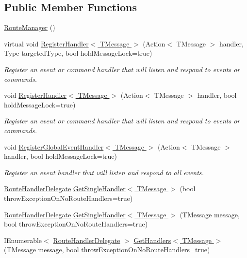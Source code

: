 \subsection*{Public Member Functions}
\begin{DoxyCompactItemize}
\item 
\hyperlink{classCqrs_1_1Bus_1_1RouteManager_abcc8a62319ac7a6edd38ed2d26ef5234_abcc8a62319ac7a6edd38ed2d26ef5234}{Route\+Manager} ()
\item 
virtual void \hyperlink{classCqrs_1_1Bus_1_1RouteManager_a5a01e8a6c9ae6311bca2d9e5cb75a7b9_a5a01e8a6c9ae6311bca2d9e5cb75a7b9}{Register\+Handler$<$ T\+Message $>$} (Action$<$ T\+Message $>$ handler, Type targeted\+Type, bool hold\+Message\+Lock=true)
\begin{DoxyCompactList}\small\item\em Register an event or command handler that will listen and respond to events or commands. \end{DoxyCompactList}\item 
void \hyperlink{classCqrs_1_1Bus_1_1RouteManager_aeb620222dd0351a6d3848caf93e29954_aeb620222dd0351a6d3848caf93e29954}{Register\+Handler$<$ T\+Message $>$} (Action$<$ T\+Message $>$ handler, bool hold\+Message\+Lock=true)
\begin{DoxyCompactList}\small\item\em Register an event or command handler that will listen and respond to events or commands. \end{DoxyCompactList}\item 
void \hyperlink{classCqrs_1_1Bus_1_1RouteManager_a1f8fb95b11955aa0762a76f9b39233ec_a1f8fb95b11955aa0762a76f9b39233ec}{Register\+Global\+Event\+Handler$<$ T\+Message $>$} (Action$<$ T\+Message $>$ handler, bool hold\+Message\+Lock=true)
\begin{DoxyCompactList}\small\item\em Register an event handler that will listen and respond to all events. \end{DoxyCompactList}\item 
\hyperlink{classCqrs_1_1Bus_1_1RouteHandlerDelegate}{Route\+Handler\+Delegate} \hyperlink{classCqrs_1_1Bus_1_1RouteManager_a1fafb5abc81384949c51b1d8887a7921_a1fafb5abc81384949c51b1d8887a7921}{Get\+Single\+Handler$<$ T\+Message $>$} (bool throw\+Exception\+On\+No\+Route\+Handlers=true)
\item 
\hyperlink{classCqrs_1_1Bus_1_1RouteHandlerDelegate}{Route\+Handler\+Delegate} \hyperlink{classCqrs_1_1Bus_1_1RouteManager_aa681cc48828440452f6984f198369e69_aa681cc48828440452f6984f198369e69}{Get\+Single\+Handler$<$ T\+Message $>$} (T\+Message message, bool throw\+Exception\+On\+No\+Route\+Handlers=true)
\item 
I\+Enumerable$<$ \hyperlink{classCqrs_1_1Bus_1_1RouteHandlerDelegate}{Route\+Handler\+Delegate} $>$ \hyperlink{classCqrs_1_1Bus_1_1RouteManager_a738be20bb4ad702f7689e2aad70a9dc5_a738be20bb4ad702f7689e2aad70a9dc5}{Get\+Handlers$<$ T\+Message $>$} (T\+Message message, bool throw\+Exception\+On\+No\+Route\+Handlers=true)
\end{DoxyCompactItemize}
